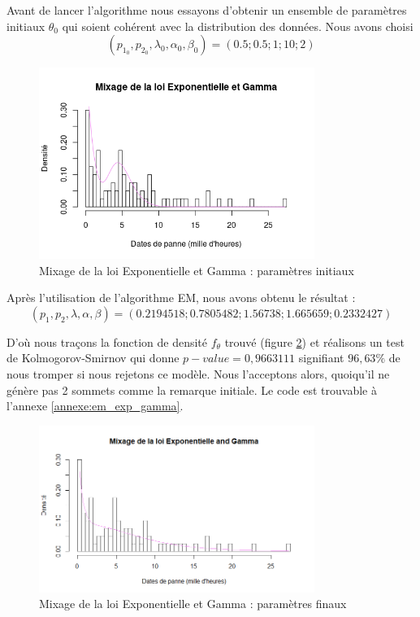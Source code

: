 \documentclass[10pt,a4paper]{article}
\begin{document}
Avant de lancer l'algorithme nous essayons d'obtenir un ensemble de paramètres initiaux $\theta_{0}$
qui soient cohérent avec la distribution des données. Nous avons choisi 
\[\left( {{p_{1_0}},{p_{2_0}},\lambda_{0} ,\alpha_{0} ,\beta_{0} } \right) = \left( {0.5;0.5;1;10;2} \right)\]

\begin{figure}[!h]
    \centering
    \includegraphics[width=0.8\textwidth]{img/loi_initiale_Exp_Gamma.png}
    \caption{Mixage de la loi Exponentielle et Gamma : paramètres initiaux}
    \label{mixage_init}
\end{figure}

Après l'utilisation de l'algorithme EM, nous avons obtenu le résultat :
\[\left( {{p_1},{p_2},\lambda ,\alpha ,\beta } \right) = \left( {0.2194518;0.7805482;1.56738;1.665659;0.2332427} \right)\]

D'où nous traçons la fonction de densité $f_\theta$ trouvé (figure \ref{mixage}) et réalisons un test de Kolmogorov-Smirnov qui donne $p-value=0,9663111$ signifiant $96,63\%$ de nous tromper si nous rejetons ce modèle. Nous l'acceptons alors, quoiqu'il ne génère pas 2 sommets comme la remarque initiale. Le code est trouvable à l'annexe \ref{annexe:em_exp_gamma}.

\begin{figure}[!h]
    \centering
    \includegraphics[width=0.8\textwidth]{img/EM_Exp_Gamma.png}
    \caption{Mixage de la loi Exponentielle et Gamma : paramètres finaux}
    \label{mixage}
\end{figure}
\end{document}
